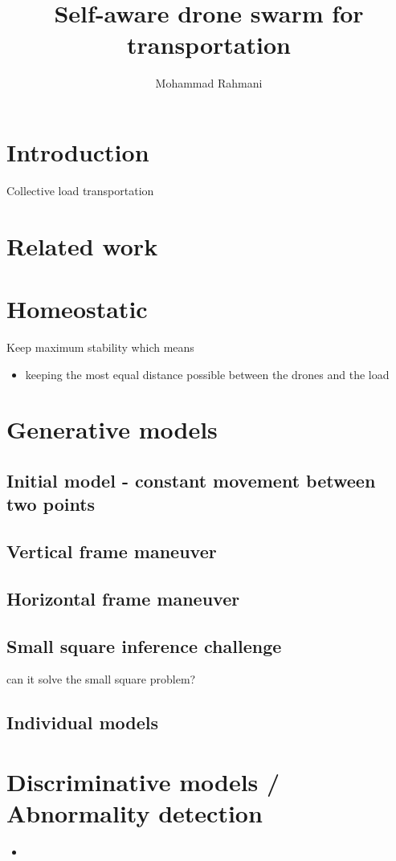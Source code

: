 \documentclass{article}
\begin{document}
	
	\title{Self-aware drone swarm for transportation}
	\author{Mohammad Rahmani}
	\date{}
	\maketitle
	\section{Introduction}
	Collective load transportation
	
	\section{Related work}
	
	\section{Homeostatic}
	Keep maximum stability which means 
		\begin{itemize}
			\item keeping the most equal distance possible between the drones and the load
		\end{itemize}
		
	\section{Generative models}
		\subsection{Initial model - constant movement between two points}
		\subsection{Vertical frame maneuver}
		\subsection{Horizontal frame maneuver}
		\subsection{Small square inference challenge} can it solve the small square problem?
		
		\subsection{Individual models}
	\section{Discriminative models / Abnormality detection }
		\begin{itemize}
			\item 
		\end{itemize}
	
\end{document}
